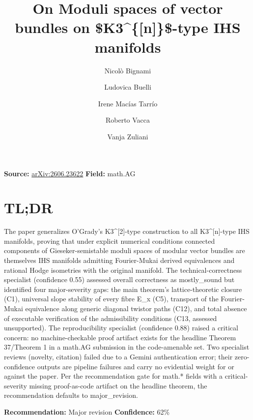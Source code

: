 \documentclass[11pt]{article}
\title{On Moduli spaces of vector bundles on \$K3\^{}\{[n]\}\$-type IHS manifolds}
\author{Nicolò Bignami \and Ludovica Buelli \and Irene Macías Tarrío \and Roberto Vacca \and Vanja Zuliani}
\date{}
\begin{document}
\maketitle

\noindent\textbf{Source:} \href{https://arxiv.org/abs/2606.23622}{arXiv:2606.23622} \quad \textbf{Field:} math.AG\\

\section*{TL;DR}
The paper generalizes O'Grady's K3\^{}[2]-type construction to all K3\^{}[n]-type IHS manifolds, proving that under explicit numerical conditions connected components of Gieseker-semistable moduli spaces of modular vector bundles are themselves IHS manifolds admitting Fourier-Mukai derived equivalences and rational Hodge isometries with the original manifold. The technical-correctness specialist (confidence 0.55) assessed overall correctness as mostly\_sound but identified four major-severity gaps: the main theorem's lattice-theoretic closure (C1), universal slope stability of every fibre E\_x (C5), transport of the Fourier-Mukai equivalence along generic diagonal twistor paths (C12), and total absence of executable verification of the admissibility conditions (C13, assessed unsupported). The reproducibility specialist (confidence 0.88) raised a critical concern: no machine-checkable proof artifact exists for the headline Theorem 37/Theorem 1 in a math.AG submission in the code-amenable set. Two specialist reviews (novelty, citation) failed due to a Gemini authentication error; their zero-confidence outputs are pipeline failures and carry no evidential weight for or against the paper. Per the recommendation gate for math.* fields with a critical-severity missing proof-as-code artifact on the headline theorem, the recommendation defaults to major\_revision.

\textbf{Recommendation:} Major revision \quad \textbf{Confidence:} 62\%\\
\end{document}
